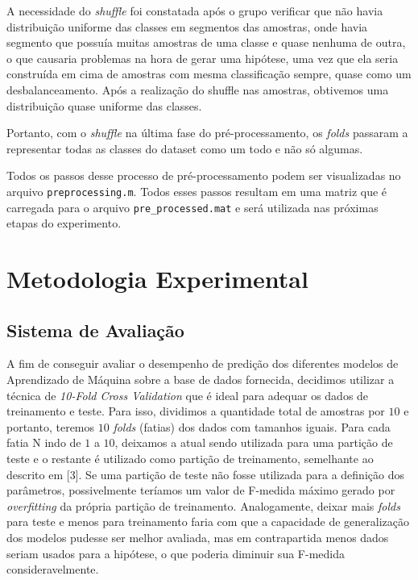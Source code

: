 \documentclass[10pt, conference, compsocconf]{IEEEtran}
\begin{document}
A necessidade do \textsl{shuffle} foi constatada após o grupo verificar que 
não havia distribuição uniforme das classes em segmentos das amostras, onde 
havia segmento que possuía muitas amostras de uma classe e quase nenhuma de 
outra, o que causaria problemas na hora de gerar uma hipótese, uma vez que ela
seria construída em cima de amostras com mesma classificação sempre, quase como
um desbalanceamento. Após a 
realização do shuffle nas amostras, obtivemos uma distribuição quase uniforme 
das classes. 

Portanto, com o \textsl{shuffle} na última fase do pré-processamento, os 
\textsl{folds} passaram a representar todas as classes do dataset como um todo e
não só algumas.
 
Todos os passos desse processo de pré-processamento podem ser visualizadas no
arquivo \texttt{preprocessing.m}. Todos esses passos resultam em uma matriz que é carregada para
o arquivo \texttt{pre\_processed.mat} e será utilizada nas próximas etapas do experimento. 


\section{Metodologia Experimental}\label{sec:metodologia}
\subsection{Sistema de Avaliação}\label{subsec:sistema_avaliacao}
A fim de conseguir avaliar o desempenho de predição dos diferentes modelos 
de Aprendizado de Máquina sobre a base de dados fornecida, decidimos utilizar 
a técnica de \textsl{10-Fold Cross Validation} que é ideal para adequar os 
dados de treinamento e teste. Para isso, dividimos a quantidade total de 
amostras por $10$ e portanto, teremos $10$ \textsl{folds} (fatias) dos dados 
com tamanhos iguais. Para cada fatia N indo de $1$ a $10$, deixamos a atual 
sendo utilizada para uma partição de teste e o restante é utilizado como partição 
de treinamento, semelhante ao descrito em [3]. Se uma partição de 
teste não fosse utilizada para a definição dos parâmetros, possivelmente 
teríamos um valor de F-medida máximo gerado por \textsl{overfitting} da própria 
partição de treinamento. Analogamente, deixar mais \textsl{folds} para teste e
menos para treinamento faria com que a capacidade de generalização dos modelos
pudesse ser melhor avaliada, mas em contrapartida menos dados seriam usados para
a hipótese, o que poderia diminuir sua F-medida consideravelmente.
\end{document}
